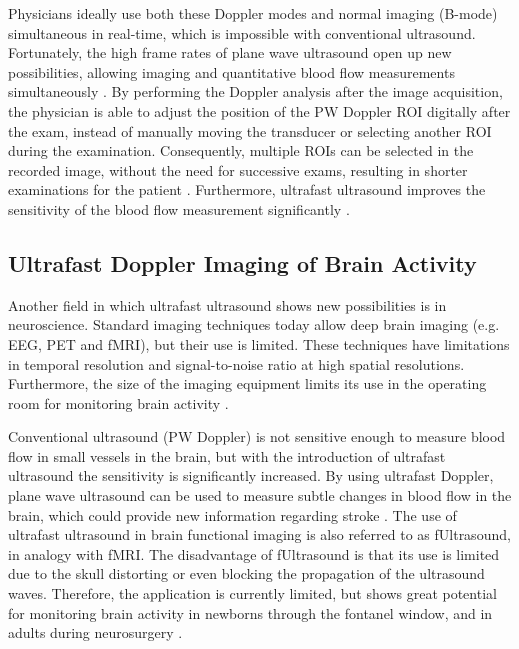 Physicians ideally use both these Doppler modes and normal imaging (B-mode) simultaneous in real-time, which is impossible with conventional ultrasound. Fortunately, the high frame rates of plane wave ultrasound open up new possibilities, allowing imaging and quantitative blood flow measurements simultaneously \cite{minin_ultrafast_2011}. By performing the Doppler analysis after the image acquisition, the physician is able to adjust the position of the PW Doppler ROI digitally after the exam, instead of manually moving the transducer or selecting another ROI during the examination. Consequently, multiple ROIs can be selected in the recorded image, without the need for successive exams, resulting in shorter examinations for the patient \cite{tanter_ultrafast_2014}. Furthermore, ultrafast ultrasound improves the sensitivity of the blood flow measurement significantly \cite{minin_ultrafast_2011}. 



\subsection{Ultrafast Doppler Imaging of Brain Activity}
Another field in which ultrafast ultrasound shows new possibilities is in neuroscience. Standard imaging techniques today allow deep brain imaging (e.g. EEG, PET and fMRI), but their use is limited. These techniques have limitations in temporal resolution and signal-to-noise ratio at high spatial resolutions. Furthermore, the size of the imaging equipment limits its use in the operating room for monitoring brain activity \cite{tanter_ultrafast_2014}. 

Conventional ultrasound (PW Doppler) is not sensitive enough to measure blood flow in small vessels in the brain, but with the introduction of ultrafast ultrasound the sensitivity is significantly increased. By using ultrafast Doppler, plane wave ultrasound can be used to measure subtle changes in blood flow in the brain, which could provide new information regarding stroke \cite{tanter_ultrafast_2014}. The use of ultrafast ultrasound in brain functional imaging is also referred to as fUltrasound, in analogy with fMRI. The disadvantage of fUltrasound is that its use is limited due to the skull distorting or even blocking the propagation of the ultrasound waves. Therefore, the application is currently limited, but shows great potential for monitoring brain activity in newborns through the fontanel window, and in adults during neurosurgery \cite{tanter_ultrafast_2014}. 




